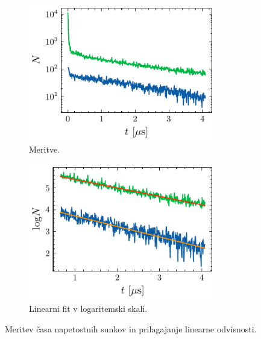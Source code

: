 \documentclass[11pt, oneside]{article}
\theoremstyle{definition}
\begin{document}
\begin{figure}[h!]
    \centering
    \begin{subfigure}[b]{0.49\textwidth}
        \centering
        \includegraphics[width=0.9\textwidth]{mioni_meritve.pdf}
        \caption{Meritve.}
        \label{fig: mu1}
    \end{subfigure}
    \hfill
    \begin{subfigure}[b]{0.49\textwidth}
        \centering
        \includegraphics[width=0.9\textwidth]{mioni_fit.pdf}
        \caption{Linearni fit v logaritemski skali.}
        \label{fig: mu2}
    \end{subfigure}
    \caption{Meritev časa napetostnih sunkov in prilagajanje linearne odvisnosti.}
    \label{fig: mu}
\end{figure}
\end{document}

